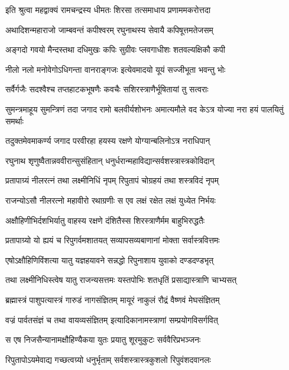 \twolineshloka
{इति श्रुत्वा महद्वाक्यं रामचन्द्रस्य धीमतः}
{शिरसा तत्समाधाय प्रणाममकरोत्तदा}%

\twolineshloka
{अथादिशन्महाराजो जाम्बवन्तं कपीश्वरम्}
{रघुनाथस्य सेवायै कपिषूत्तमतेजसम्}%

\twolineshloka
{अङ्गदो गवयो मैन्दस्तथा दधिमुखः कपिः}
{सुग्रीवः प्लवगाधीशः शतवल्यक्षिकौ कपी}%

\twolineshloka
{नीलो नलो मनोवेगोऽधिगन्ता वानराङ्गजः}
{इत्येवमादयो यूयं सज्जीभूता भवन्तु भोः}%

\twolineshloka
{सर्वैर्गजैः सदश्वैश्च तप्तहाटकभूषणैः}
{कवचैः सशिरस्त्राणैर्भूषितायां तु सत्वराः}%


\twolineshloka
{सुमन्त्रमाहूय सुमन्त्रिणं तदा जगाद रामो बलवीर्यशोभनः}
{अमात्यमौले वद केऽत्र योज्या नरा हयं पालयितुं समर्थाः}%

\twolineshloka
{तदुक्तमेवमाकर्ण्य जगाद परवीरहा}
{हयस्य रक्षणे योग्यान्बलिनोऽत्र नराधिपान्}%

\twolineshloka
{रघुनाथ शृणुष्वैतान्नववीरान्सुसंहितान्}
{धनुर्धरान्महाविद्यान्सर्वशस्त्रास्त्रकोविदान्}%

\twolineshloka
{प्रतापाग्र्यं नीलरत्नं तथा लक्ष्मीनिधिं नृपम्}
{रिपुतापं चोग्रहयं तथा शस्त्रविदं नृपम्}%

\twolineshloka
{राजन्योऽसौ नीलरत्नो महावीरो रथाग्रणीः}
{स एव लक्षं रक्षेत लक्षं युध्येत निर्भयः}%

\twolineshloka
{अक्षौहिणीभिर्दशभिर्यातु वाहस्य रक्षणे}
{दंशितैस्स शिरस्त्राणैर्मम बाहुभिरुद्धतैः}%

\twolineshloka
{प्रतापाग्र्यो यो ह्ययं च रिपुगर्वमशातयत्}
{सव्यापसव्यबाणानां मोक्ता सर्वास्त्रवित्तमः}%

\twolineshloka
{एषोऽक्षौहिणिविंशत्या यातु यज्ञहयावने}
{सन्नद्धो रिपुनाशाय युवाको दण्डदण्डभृत्}%

\twolineshloka
{तथा लक्ष्मीनिधिस्त्वेष यातु राजन्यसत्तमः}
{यस्तपोभिः शतधृतिं प्रसाद्यास्त्राणि चाभ्यसत्}%

\twolineshloka
{ब्रह्मास्त्रं पाशुपत्यास्त्रं गारुडं नागसंज्ञितम्}
{मायूरं नाकुलं रौद्रं वैष्णवं मेघसंज्ञितम्}%

\twolineshloka
{वज्रं पार्वतसंज्ञं च तथा वायव्यसंज्ञितम्}
{इत्यादिकानामस्त्राणां सम्प्रयोगविसर्गवित्}%

\twolineshloka
{स एष निजसैन्यानामक्षौहिण्यैकया युतः}
{प्रयातु शूरमुकुटः सर्ववैरिप्रभञ्जनः}%

\twolineshloka
{रिपुतापोऽयमेवाद्य गच्छत्वग्र्यो धनुर्भृताम्}
{सर्वशस्त्रास्त्रकुशलो रिपुवंशदवानलः}%

